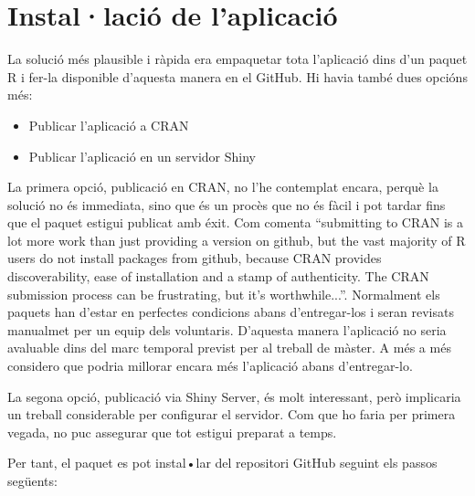 \section{Instal·lació de l'aplicació}

La solució més plausible i ràpida era empaquetar tota l'aplicació dins d'un paquet R i fer-la disponible d'aquesta manera en el GitHub. Hi havia també dues opcións més: 

\begin{itemize}
\item Publicar l'aplicació a CRAN
\item Publicar l'aplicació en un servidor Shiny
\end{itemize}
La primera opció, publicació en CRAN, no l’he contemplat encara, perquè la solució no és immediata, sino que és un procès que no és fàcil i pot tardar fins que el paquet estigui
 publicat amb éxit. Com comenta \cite{HWick} \enquote{submitting to CRAN is a lot more work than just providing a version on github, but the vast majority of R users do not install packages from github, because CRAN provides discoverability, ease of installation and a stamp of authenticity. The CRAN submission process can be frustrating, but it’s worthwhile...}. Normalment els paquets han d’estar en perfectes condicions abans d'entregar-los i seran revisats manualmet per un equip dels voluntaris. D'aquesta manera l'aplicació no seria avaluable dins del marc temporal previst per al treball de màster. A més a més considero que podria millorar encara més l'aplicació abans d'entregar-lo.

La segona opció, publicació via Shiny Server, és molt interessant, però implicaria un treball considerable per configurar el servidor. Com que ho faria per primera vegada, no puc assegurar que tot estigui preparat a temps. 

Per tant, el paquet  es pot instal•lar del repositori GitHub seguint els passos següents:

